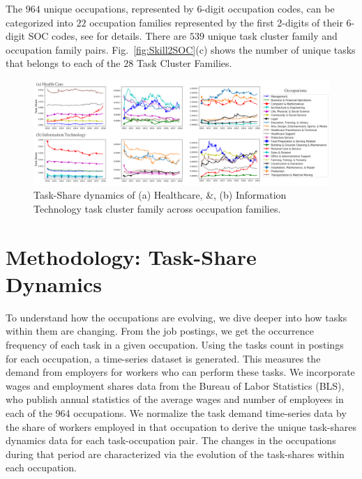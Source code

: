 \documentclass[letterpaper]{article} %
\begin{document}
The $964$ unique occupations, represented by 6-digit occupation codes, can be categorized into $22$ occupation families represented by the first 2-digits of their 6-digit SOC codes, see \cite{fleming2019future} for details. There are $539$ unique task cluster family and occupation family pairs. Fig.~\ref{fig:Skill2SOC}(c) shows the number of unique tasks that belongs to each of the $28$ Task Cluster Families.
%
\begin{figure}[t]
\centering
  \includegraphics[width=0.95\linewidth]{combined_health_IT.png}
  \caption{Task-Share dynamics of (a) Healthcare, \&, (b) Information Technology task cluster family across occupation families.}
  \label{fig:SCF_health_IT}
\end{figure}
%

\section{Methodology: Task-Share Dynamics}
\label{sec:methods}
%
To understand how the occupations are evolving, we dive deeper into how tasks within them are changing. From the job postings, we get the occurrence frequency of each task in a given occupation. Using the tasks count in postings for each occupation, a time-series dataset is generated. This measures the demand from employers for workers who can perform these tasks. We incorporate wages and employment shares data from the Bureau of Labor Statistics (BLS), who publish annual statistics of the average wages and number of employees in each of the 964 occupations. We normalize the task demand time-series data by the share of workers employed in that occupation to derive the unique task-shares dynamics data for each task-occupation pair. The changes in the occupations during that period are characterized via the evolution of the task-shares within each occupation.
\end{document}
